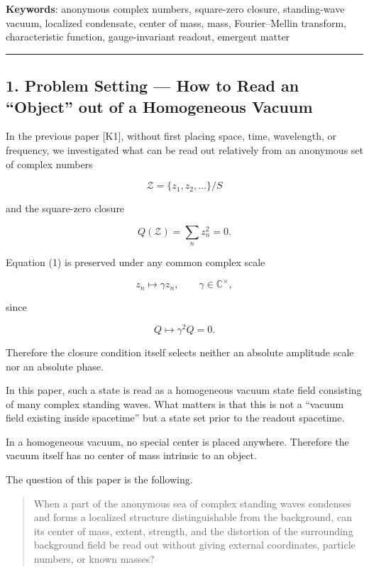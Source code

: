 \documentclass[
  a4paper,
]{article}
\begin{document}
\textbf{Keywords}: anonymous complex numbers, square-zero closure,
standing-wave vacuum, localized condensate, center of mass, mass,
Fourier--Mellin transform, characteristic function, gauge-invariant
readout, emergent matter

\begin{center}\rule{0.5\linewidth}{0.5pt}\end{center}

\subsection{1. Problem Setting --- How to Read an ``Object'' out of a
Homogeneous
Vacuum}\label{problem-setting-how-to-read-an-object-out-of-a-homogeneous-vacuum}

In the previous paper {[}K1{]}, without first placing space, time,
wavelength, or frequency, we investigated what can be read out
relatively from an anonymous set of complex numbers

\[
\mathcal Z
=
\{z_1,z_2,\ldots\}/S
\]

and the square-zero closure

\[
Q(\mathcal Z)
=
\sum_n z_n^2
=
0.
\tag{1}
\]

Equation (1) is preserved under any common complex scale

\[
z_n\mapsto \gamma z_n,
\qquad
\gamma\in\mathbb C^\times,
\]

since

\[
Q\mapsto \gamma^2Q=0.
\]

Therefore the closure condition itself selects neither an absolute
amplitude scale nor an absolute phase.

In this paper, such a state is read as a homogeneous vacuum state field
consisting of many complex standing waves. What matters is that this is
not a ``vacuum field existing inside spacetime'' but a state set prior
to the readout spacetime.

In a homogeneous vacuum, no special center is placed anywhere. Therefore
the vacuum itself has no center of mass intrinsic to an object.

The question of this paper is the following.

\begin{quote}
When a part of the anonymous sea of complex standing waves condenses and
forms a localized structure distinguishable from the background, can its
center of mass, extent, strength, and the distortion of the surrounding
background field be read out without giving external coordinates,
particle numbers, or known masses?
\end{quote}
\end{document}
